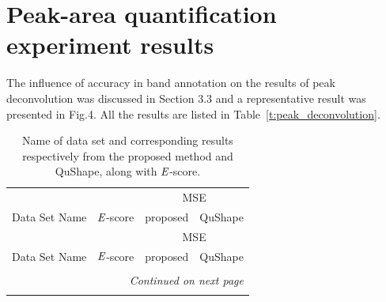 \documentclass[letter]{bioinfo}
\newcommand{\escore}{{\emph{E}}}
\begin{document}
\section{ Peak-area quantification experiment results }
The influence of accuracy in band annotation on the results of peak deconvolution was discussed in Section 3.3 and a representative result was presented in Fig.4. All the results are listed in Table~\ref{t:peak_deconvolution}.





\onecolumn


\begin{center}
\begin{longtable}{l ccc}

\caption{Name of data set and corresponding results respectively from the proposed method and QuShape, along with $\escore$-score.} \label{t:95_data_sets} \\
 & & \multicolumn{2}{c}{MSE} \\
Data Set Name & $\escore$-score & \multicolumn{1}{c}{proposed} & QuShape \\\hline
\endfirsthead

 & & \multicolumn{2}{c}{MSE} \\
Data Set Name & $\escore$-score & \multicolumn{1}{c}{proposed} & QuShape \\\hline
\endhead

\\
\multicolumn{4}{r}{\textit{Continued on next page}} \\
\endfoot
\endlastfoot



\end{longtable}
\end{center}
\end{document}
